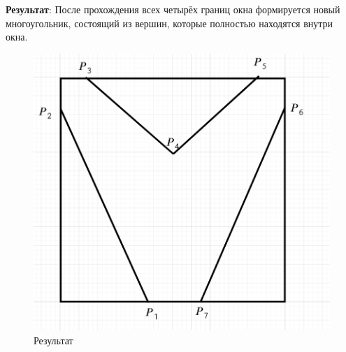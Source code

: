 \textbf{Результат}: После прохождения всех четырёх границ окна формируется новый многоугольник, состоящий из вершин, которые полностью находятся внутри окна.

\begin{figure}[H]
    \centering
    \includegraphics[width=0.5\linewidth]{final.png}
    \caption{Результат}
    \label{fig:final}
\end{figure}

